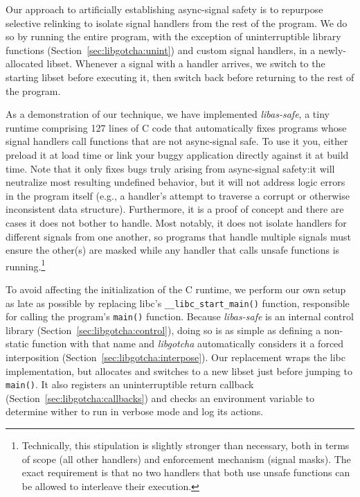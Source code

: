Our approach to artificially establishing async-signal safety is to repurpose
selective relinking to isolate signal handlers from the rest of the program.  We do
so by running the entire program, with the exception of uninterruptible library
functions (Section~\ref{sec:libgotcha:unint}) and custom signal handlers, in a
newly-allocated libset.  Whenever a signal with a handler arrives, we switch to the
starting libset before executing it, then switch back before returning to the rest of
the program.

As a demonstration of our technique, we have implemented \textit{libas-safe}, a tiny
runtime comprising 127 lines of C code that automatically fixes programs whose signal
handlers call functions that are not async-signal safe.  To use it you, either
preload it at load time or link your buggy application directly against it at build
time.  Note that it only fixes bugs truly arising from async-signal safety:\@ it will
neutralize most resulting undefined behavior, but it will not address logic errors in
the program itself (e.g., a handler's attempt to traverse a corrupt or otherwise
inconsistent data structure).  Furthermore, it is a proof of concept and there are
cases it does not bother to handle.  Most notably, it does not isolate handlers for
different signals from one another, so programs that handle multiple signals must
ensure the other(s) are masked while any handler that calls unsafe functions is
running.\footnote{Technically, this stipulation is slightly stronger than necessary,
both in terms of scope (all other handlers) and enforcement mechanism (signal masks).
The exact requirement is that no two handlers that both use unsafe functions can be
allowed to interleave their execution.}

To avoid affecting the initialization of the C runtime, we perform our own setup as
late as possible by replacing libc's \texttt{\_\_libc\_start\_main()} function,
responsible for calling the program's \texttt{main()} function.  Because
\textit{libas-safe} is an internal control library
(Section~\ref{sec:libgotcha:control}), doing so is as simple as defining a
non-static function with that name and \textit{libgotcha} automatically considers it
a forced interposition (Section~\ref{sec:libgotcha:interpose}).  Our replacement
wraps the libc implementation, but allocates and switches to a new libset just before
jumping to \texttt{main()}.  It also registers an uninterruptible return callback
(Section~\ref{sec:libgotcha:callbacks}) and checks an environment variable to
determine wither to run in verbose mode and log its actions.

